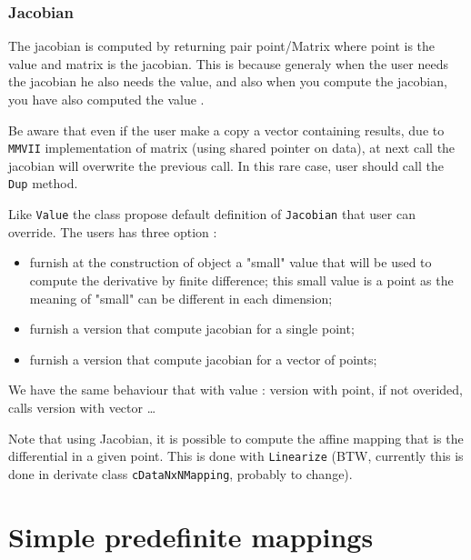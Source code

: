 \subsubsection{Jacobian}

The jacobian is computed by returning pair point/Matrix  where point is
the value  and matrix is the  jacobian. This is because generaly when the 
user needs the jacobian he also needs the value, and also when you 
compute the jacobian, you have also computed the value .

Be aware that even if the user make a copy a vector containing results,
due to {\tt MMVII} implementation of matrix (using shared pointer on data),
at next call the jacobian will overwrite the previous call.  In this rare
case, user should call the {\tt Dup} method.

Like {\tt Value} the  class propose default definition of {\tt Jacobian} that user can override.
The users has three option :

\begin{itemize}
      \item  furnish at the construction of object a "small" value that will be used to 
	      compute the derivative by finite difference;  this small value is a point as  the
             meaning of "small" can be different in each dimension;

      \item  furnish a version that compute jacobian for a single point;

      \item  furnish a version that compute jacobian for a vector of  points;
\end{itemize}

We have the same behaviour that with value : version with point, if not overided, calls version
with vector \dots 

Note that using Jacobian, it is possible to compute the affine mapping that is the
differential in a given point. This is done with {\tt Linearize}  (BTW, currently
this is done in derivate class {\tt cDataNxNMapping}, probably to change).


\section{Simple predefinite mappings}


